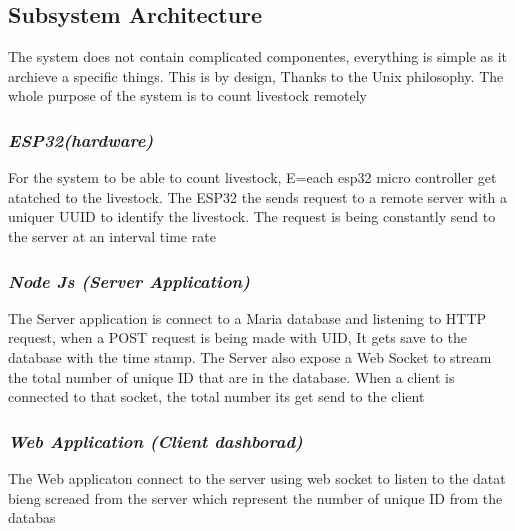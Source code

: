\subsection{Subsystem Architecture}

The system does not contain complicated componentes, everything is simple as it
archieve a specific things. This is by design, Thanks to the Unix philosophy. The
whole purpose of the system is to count livestock remotely


\subsubsection{\textit{ESP32(hardware)}}

For the system to be able to count livestock, E=each esp32 micro controller
get atatched to the livestock. The ESP32 the sends request to a remote server
with a uniquer UUID to identify the livestock. The request is being constantly send
to the server at an interval time rate

\subsubsection{\textit{Node Js (Server Application)}}

The Server application is connect to a Maria database and listening to HTTP request,
when a POST request is being made with UID, It gets save to the database with the time
stamp. The Server also expose a Web Socket to stream the total number of unique ID that are in the database.
When a client is connected to that socket, the total number its get send to the client

\subsubsection{\textit{Web Application (Client dashborad)}}
The Web applicaton connect to the server using web socket to listen to the datat bieng screaed from
the server which represent the number of unique ID from the databas

